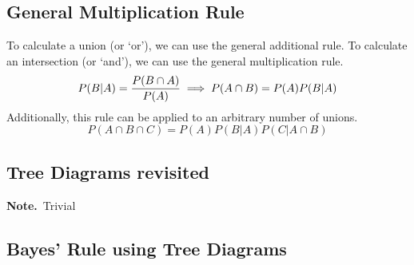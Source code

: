 \documentclass{report}
\newcommand{\nt}[1]{\textbf{Note.}\ #1 }
\begin{document}
        \subsection{General Multiplication Rule}  %
            To calculate a union (or `or'), we can use the general additional rule. To calculate an intersection (or `and'), we can use the general multiplication rule.
            \begin{equation}
                P(B\vert A)=\frac{P(B\cap A)}{P(A)} \implies P(A\cap B) = P(A)P(B\vert A) \\
            \end{equation}
            Additionally, this rule can be applied to an arbitrary number of unions.
            \begin{equation}
                P(A\cap B\cap C)=P(A)P(B\vert A)P(C\vert A\cap B)
            \end{equation}
        \subsection{Tree Diagrams revisited}  %
            \nt{Trivial}
        \subsection{Bayes' Rule using Tree Diagrams}  %
\end{document}
